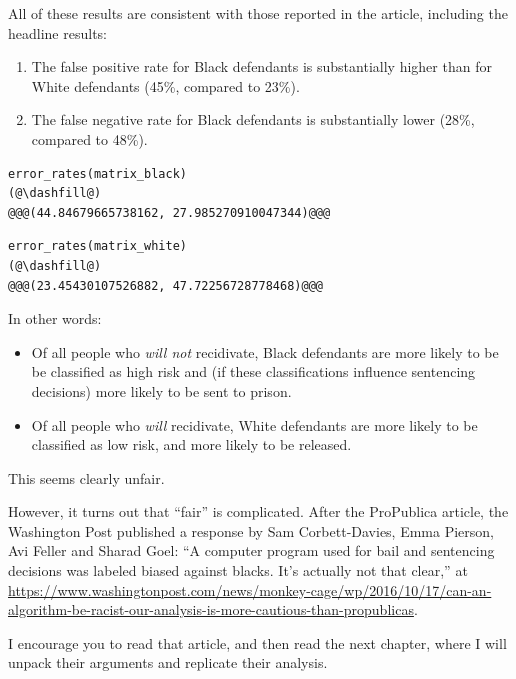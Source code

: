 All of these results are consistent with those reported in the article,
including the headline results:

\begin{enumerate}
\def\labelenumi{\arabic{enumi}.}
\item
  The false positive rate for Black defendants is substantially higher
  than for White defendants (45\%, compared to 23\%).
\item
  The false negative rate for Black defendants is substantially lower
  (28\%, compared to 48\%).
\end{enumerate}

\begin{lstlisting}[]
error_rates(matrix_black)
(@\dashfill@)
@@@(44.84679665738162, 27.985270910047344)@@@
\end{lstlisting}

\begin{lstlisting}[]
error_rates(matrix_white)
(@\dashfill@)
@@@(23.45430107526882, 47.72256728778468)@@@
\end{lstlisting}

In other words:

\begin{itemize}
\item
  Of all people who \emph{will not} recidivate, Black defendants are
  more likely to be be classified as high risk and (if these
  classifications influence sentencing decisions) more likely to be sent
  to prison.
\item
  Of all people who \emph{will} recidivate, White defendants are more
  likely to be classified as low risk, and more likely to be released.
\end{itemize}

This seems clearly unfair.

However, it turns out that ``fair'' is complicated. After the ProPublica
article, the Washington Post published a response by Sam Corbett-Davies,
Emma Pierson, Avi Feller and Sharad Goel: ``A computer program used for
bail and sentencing decisions was labeled biased against blacks. It's
actually not that clear,'' at
\url{https://www.washingtonpost.com/news/monkey-cage/wp/2016/10/17/can-an-algorithm-be-racist-our-analysis-is-more-cautious-than-propublicas}.

I encourage you to read that article, and then read the next chapter,
where I will unpack their arguments and replicate their analysis.

